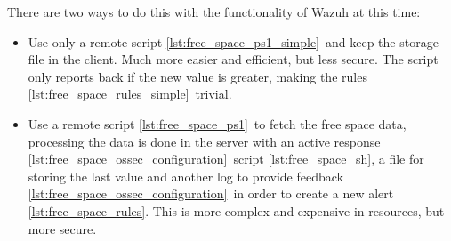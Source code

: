 \linej
There are two ways to do this with the functionality of Wazuh at this time:
\begin{itemize}
	\item Use only a remote script \ref{lst:free_space_ps1_simple}\ and keep the storage file in the client. Much more easier and efficient, but less secure. The script only reports back if the new value is greater, making the rules \ref{lst:free_space_rules_simple}\ trivial.
	\item Use a remote script \ref{lst:free_space_ps1}\ to fetch the free space data, processing the data is done in the server with an active response \ref{lst:free_space_ossec_configuration}\ script \ref{lst:free_space_sh}, a file for storing the last value and another log to provide feedback \ref{lst:free_space_ossec_configuration}\ in order to create a new alert \ref{lst:free_space_rules}. This is more complex and expensive in resources, but more secure.
\end{itemize}

